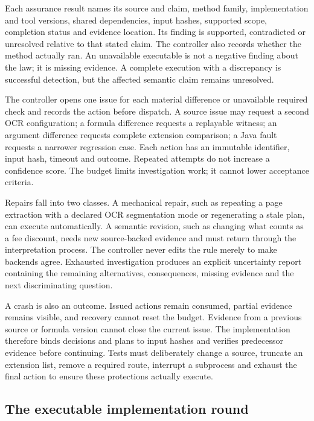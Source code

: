 Each assurance result names its source and claim, method family, implementation
and tool versions, shared dependencies, input hashes, supported scope, completion
status and evidence location. Its finding is supported, contradicted or
unresolved relative to that stated claim. The controller also records whether
the method actually ran. An unavailable executable is not a negative finding
about the law; it is missing evidence. A complete execution with a discrepancy
is successful detection, but the affected semantic claim remains unresolved.

The controller opens one issue for each material difference or unavailable
required check and records the action before dispatch. A source issue may request
a second OCR configuration; a formula difference requests a replayable witness;
an argument difference requests complete extension comparison; a Java fault
requests a narrower regression case. Each action has an immutable identifier,
input hash, timeout and outcome. Repeated attempts do not increase a confidence
score. The budget limits investigation work; it cannot lower acceptance criteria.

Repairs fall into two classes. A mechanical repair, such as repeating a page
extraction with a declared OCR segmentation mode or regenerating a stale plan,
can execute automatically. A semantic revision, such as changing what counts as
a fee discount, needs new source-backed evidence and must return through the
interpretation process. The controller never edits the rule merely to make
backends agree. Exhausted investigation produces an explicit uncertainty report
containing the remaining alternatives, consequences, missing evidence and the
next discriminating question.

A crash is also an outcome. Issued actions remain consumed, partial evidence
remains visible, and recovery cannot reset the budget. Evidence from a previous
source or formula version cannot close the current issue. The implementation
therefore binds decisions and plans to input hashes and verifies predecessor
evidence before continuing. Tests must deliberately change a source, truncate
an extension list, remove a required route, interrupt a subprocess and exhaust
the final action to ensure these protections actually execute.

\subsection{The executable implementation round}

